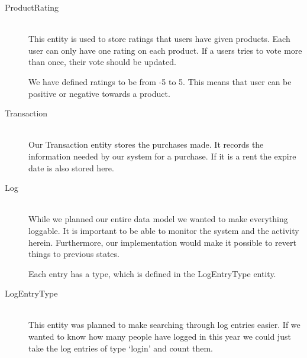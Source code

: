 \begin{description}
\item[ProductRating] \hfill \\
This entity is used to store ratings that users have given products. Each user can only have one rating on each product. If a users tries to vote more than once, their vote should be updated.

We have defined ratings to be from -5 to 5. This means that user can be positive or negative towards a product.

\item[Transaction] \hfill \\
Our Transaction entity stores the purchases made. It records the information needed by our system for a purchase. If it is a rent the expire date is also stored here.

\item[Log] \hfill \\
While we planned our entire data model we wanted to make everything loggable. It is important to be able to monitor the system and the activity herein. Furthermore, our implementation would make it possible to revert things to previous states.

Each entry has a type, which is defined in the LogEntryType entity.

\item[LogEntryType] \hfill \\
This entity was planned to make searching through log entries easier. If we wanted to know how many people have logged in this year we could just take the log entries of type `login' and count them.
\end{description}